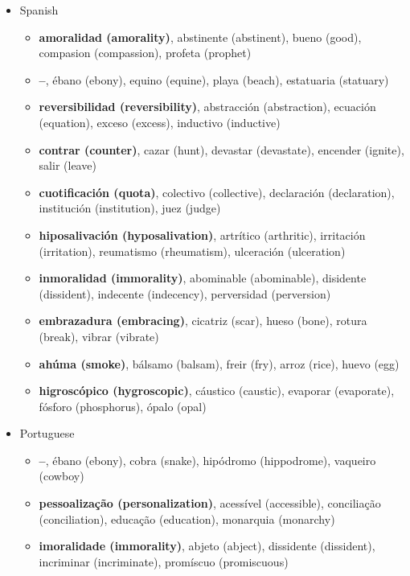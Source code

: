\documentclass[output=paper]{langsci/langscibook}
\begin{document}
 \label{sec:07:appendix}
 
 \begin{itemize}[leftmargin=*]\sloppy
	\item Spanish
	\begin{itemize}
		\item \textbf{amoralidad (amorality)}, abstinente (abstinent), bueno (good), compasion (compassion), profeta (prophet)
		\item \textbf{--}, ébano (ebony), equino (equine), playa (beach), estatuaria (statuary)
		\item \textbf{reversibilidad (reversibility)}, abstracción (abstraction), ecuación (equation), exceso (excess), inductivo (inductive)
		\item \textbf{contrar (counter)}, cazar (hunt), devastar (devastate), encender (ignite), salir (leave)
		\item \textbf{cuotificación (quota)}, colectivo (collective), declaración (declaration), institución (institution), juez (judge)
		\item \textbf{hiposalivación (hyposalivation)}, artrítico (arthritic), irritación (irritation), reumatismo (rheumatism), ulceración (ulceration)
		\item \textbf{inmoralidad (immorality)}, abominable (abominable), disidente (dissident), indecente (indecency), perversidad (perversion)
		\item \textbf{embrazadura (embracing)}, cicatriz (scar), hueso (bone), rotura (break), vibrar (vibrate)
		\item \textbf{ahúma (smoke)}, bálsamo (balsam), freir (fry), arroz (rice), huevo (egg)
		\item \textbf{higroscópico (hygroscopic)}, cáustico (caustic), evaporar (evaporate), fósforo (phosphorus), ópalo (opal)
	\end{itemize}
	\pagebreak
	\item Portuguese
	\begin{itemize}
		\item \textbf{--}, ébano (ebony), cobra (snake), hipódromo (hippodrome), vaqueiro (cowboy)
		\item \textbf{pessoalização (personalization)}, acessível (accessible), conciliação (conciliation), educação (education), monarquia (monarchy) 
		\item \textbf{imoralidade (immorality)}, abjeto (abject), dissidente (dissident), incriminar (incriminate), promíscuo (promiscuous)

\end{itemize}
\end{itemize}
\end{document}
